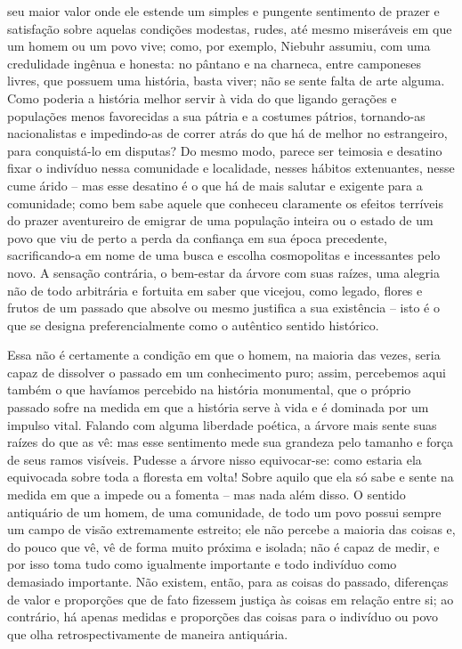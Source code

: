 seu maior valor onde ele estende um simples e pungente sentimento de
prazer e satisfação sobre aquelas condições modestas, rudes, até mesmo
miseráveis em que um homem ou um povo vive; como, por exemplo, Niebuhr
assumiu, com uma credulidade ingênua e honesta: no pântano e na
charneca, entre camponeses livres, que possuem uma história, basta
viver; não se sente falta de arte alguma. Como poderia a história melhor
servir à vida do que ligando gerações e populações menos favorecidas a
sua pátria e a costumes pátrios, tornando-as nacionalistas e
impedindo-as de correr atrás do que há de melhor no estrangeiro, para
conquistá-lo em disputas? Do mesmo modo, parece ser teimosia e desatino
fixar o indivíduo nessa comunidade e localidade, nesses hábitos
extenuantes, nesse cume árido -- mas esse desatino é o que há de mais
salutar e exigente para a comunidade; como bem sabe aquele que conheceu
claramente os efeitos terríveis do prazer aventureiro de emigrar de uma
população inteira ou o estado de um povo que viu de perto a perda da
confiança em sua época precedente, sacrificando-a em nome de uma busca e
escolha cosmopolitas e incessantes pelo novo. A sensação contrária, o
bem-estar da árvore com suas raízes, uma alegria não de todo arbitrária
e fortuita em saber que vicejou, como legado, flores e frutos de um
passado que absolve ou mesmo justifica a sua existência -- isto é o que
se designa preferencialmente como o autêntico sentido histórico.

Essa não é certamente a condição em que o homem, na maioria das vezes,
seria capaz de dissolver o passado em um conhecimento puro; assim,
percebemos aqui também o que havíamos percebido na história monumental,
que o próprio passado sofre na medida em que a história serve à vida e é
dominada por um impulso vital. Falando com alguma liberdade poética, a
árvore mais sente suas raízes do que as vê: mas esse sentimento mede sua
grandeza pelo tamanho e força de seus ramos visíveis. Pudesse a árvore
nisso equivocar-se: como estaria ela equivocada sobre toda a floresta em
volta! Sobre aquilo que ela só sabe e sente na medida em que a impede ou
a fomenta -- mas nada além disso. O sentido antiquário de um homem, de
uma comunidade, de todo um povo possui sempre um campo de visão
extremamente estreito; ele não percebe a maioria das coisas e, do pouco
que vê, vê de forma muito próxima e isolada; não é capaz de medir, e por
isso toma tudo como igualmente importante e todo indivíduo como
demasiado importante. Não existem, então, para as coisas do passado,
diferenças de valor e proporções que de fato fizessem justiça às coisas
em relação entre si; ao contrário, há apenas medidas e proporções das
coisas para o indivíduo ou povo que olha retrospectivamente de maneira
antiquária.

